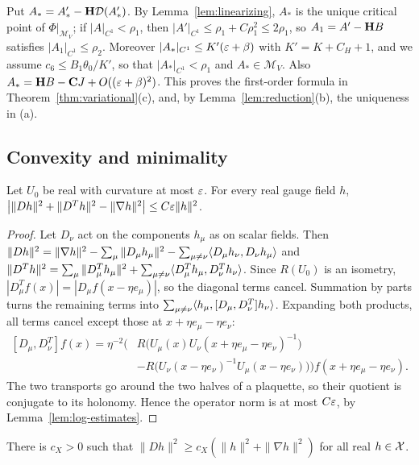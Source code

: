 Put $A_*=A'_*-\mathbf H\mathcal D(A'_*)$. By Lemma~\ref{lem:linearizing}, $A_*$ is the unique critical point of $\Phi|_{\mathcal M_V}$; if $|A|_{C^1}<\rho_1$, then $|A'|_{C^1}\le\rho_1+C\rho_1^2\le2\rho_1$, so $A_1=A'-\mathbf H B$ satisfies $|A_1|_{C^1}\le\rho_2$. Moreover $|A_*|_{C^1}\le K'(\varepsilon+\beta)$ with $K'=K+C_H+1$, and we assume $c_6\le B_1\theta_0/K'$, so that $|A_*|_{C^1}<\rho_1$ and $A_*\in\mathcal M_V$. Also $A_*=\mathbf H B-\mathbf C J+O((\varepsilon+\beta)^2)$. This proves the first-order formula in Theorem~\ref{thm:variational}(c), and, by Lemma~\ref{lem:reduction}(b), the uniqueness in (a).

\subsection{Convexity and minimality}\label{ss:26.4}

\begin{lemma}\label{lem:weitzenbock}
Let $U_0$ be real with curvature at most $\varepsilon$. For every real gauge field $h$, $\big|\|Dh\|^2+\|D^Th\|^2-\|\nabla h\|^2\big|\le C\varepsilon\|h\|^2$.
\end{lemma}

\begin{proof}
Let $D_\nu$ act on the components $h_\mu$ as on scalar fields. Then $\|Dh\|^2=\|\nabla h\|^2-\sum_\mu\|D_\mu h_\mu\|^2-\sum_{\mu\ne\nu}\langle D_\mu h_\nu,D_\nu h_\mu\rangle$ and $\|D^Th\|^2=\sum_\mu\|D^T_\mu h_\mu\|^2+\sum_{\mu\ne\nu}\langle D^T_\mu h_\mu,D^T_\nu h_\nu\rangle$. Since $R(U_0)$ is an isometry, $|D^T_\mu f(x)|=|D_\mu f(x-\eta e_\mu)|$, so the diagonal terms cancel. Summation by parts turns the remaining terms into $\sum_{\mu\ne\nu}\langle h_\mu,[D_\mu,D^T_\nu]h_\nu\rangle$. Expanding both products, all terms cancel except those at $x+\eta e_\mu-\eta e_\nu$:
\[
\begin{aligned}
[D_\mu,D^T_\nu]f(x)=\eta^{-2}\Big(&R\big(U_\mu(x)U_\nu(x+\eta e_\mu-\eta e_\nu)^{-1}\big)\\
&-R\big(U_\nu(x-\eta e_\nu)^{-1}U_\mu(x-\eta e_\nu)\big)\Big)f(x+\eta e_\mu-\eta e_\nu).
\end{aligned}
\]
The two transports go around the two halves of a plaquette, so their quotient is conjugate to its holonomy. Hence the operator norm is at most $C\varepsilon$, by Lemma~\ref{lem:log-estimates}.
\end{proof}

\begin{lemma}\label{lem:X-coercive}
There is $c_X>0$ such that $\|Dh\|^2\ge c_X(\|h\|^2+\|\nabla h\|^2)$ for all real $h\in\mathcal X$.
\end{lemma}

